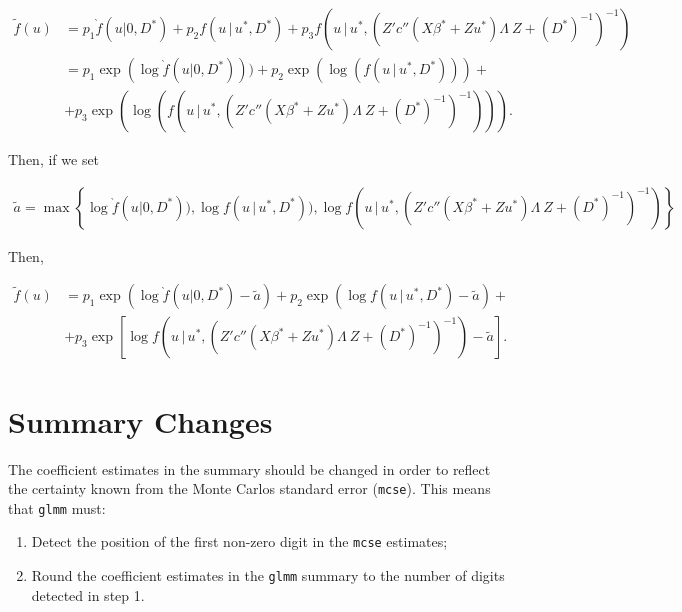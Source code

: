 \documentclass{article}
\begin{document}
\begin{align}
\tilde{f}(u) &= p_1  \grave{f}(u|0,D^*)+p_2  f(u \, | \, u^*, D^*)+p_3  f(u \, | \, u^*, (Z'  c''(X \beta^*+Zu^*) \Lambda \ Z +(D^*)^{-1}   )^{-1}) \\
&= p_1 \exp( \log  \grave{f}(u|0,D^*) ))+p_2 \exp( \log(  f(u \, | \, u^*, D^*) ))+ \nonumber \\
&+ p_3 \exp( \log( f(u \, | \, u^*, (Z'  c''(X \beta^*+Zu^*) \Lambda \ Z +(D^*)^{-1}   )^{-1}) )).
\end{align}

\noindent Then, if we set

\begin{align}
\tilde{a}= \max \left\{ \log  \grave{f}(u|0,D^*) ), \log  f(u \, | \, u^*, D^*) ), \log f(u \, | \, u^*, (Z'  c''(X \beta^*+Zu^*) \Lambda \ Z +(D^*)^{-1}   )^{-1})  \right\}
\end{align}

Then, 

\begin{align}
 \tilde{f}(u) 
&= p_1 \exp\left( \log  \grave{f}(u|0,D^*)  -\tilde{a}\right)+p_2 \exp \left( \log  f(u \, | \, u^*, D^* )-\tilde{a} \right)+ \nonumber\\
&+ p_3 \exp\left[ \log f \left(u \, | \, u^*, (Z'  c''(X \beta^*+Zu^*) \Lambda \ Z +(D^*)^{-1}   )^{-1} \right)  -\tilde{a} \right].
\end{align}

\section{Summary Changes}

The coefficient estimates in the summary should be changed in order to reflect the certainty known from the Monte Carlos standard error (\texttt{mcse}). This means that \texttt{glmm} must:

\begin{enumerate}
\item Detect the position of the first non-zero digit in the \texttt{mcse} estimates;
\item Round the coefficient estimates in the \texttt{glmm} summary to the number of digits detected in step 1.
\end{enumerate}
\end{document}
